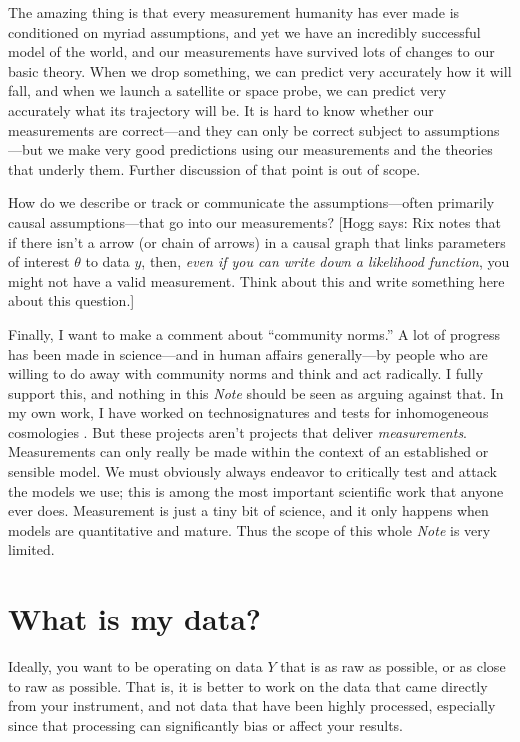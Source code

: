 \documentclass{article}
\newcommand{\documentname}{\textsl{Note}}
\newcommand{\hogg}[1]{{\color{blue}[Hogg says: {#1}]}}
\begin{document}
The amazing thing is that every measurement humanity has ever made is conditioned on myriad assumptions, and yet we have an incredibly successful model of the world, and our measurements have survived lots of changes to our basic theory.
When we drop something, we can predict very accurately how it will fall, and when we launch a satellite or space probe, we can predict very accurately what its trajectory will be.
It is hard to know whether our measurements are correct---and they can only be correct subject to assumptions---but we make very good predictions using our measurements and the theories that underly them.
Further discussion of that point is out of scope.

How do we describe or track or communicate the assumptions---often primarily causal assumptions---that go into our measurements?
\hogg{Rix notes that if there isn't a arrow (or chain of arrows) in a causal graph that links parameters of interest $\theta$ to data $y$, then, \emph{even if you can write down a likelihood function}, you might not have a valid measurement.
Think about this and write something here about this question.}

Finally, I want to make a comment about ``community norms.''
A lot of progress has been made in science---and in human affairs generally---by people who are willing to do away with community norms and think and act radically.
I fully support this, and nothing in this \documentname{} should be seen as arguing against that.
In my own work, I have worked on technosignatures \cite{techno} and tests for inhomogeneous cosmologies \cite{fractal}.
But these projects aren't projects that deliver \emph{measurements}.
Measurements can only really be made within the context of an established or sensible model.
We must obviously always endeavor to critically test and attack the models we use; this is among the most important scientific work that anyone ever does.
Measurement is just a tiny bit of science, and it only happens when models are quantitative and mature.
Thus the scope of this whole \documentname{} is very limited.

\section{What is my data?}\label{sec:data}
Ideally, you want to be operating on data $Y$ that is as raw as possible, or as close to raw as possible.
That is, it is better to work on the data that came directly from your instrument, and not data that have been highly processed, especially since that processing can significantly bias or affect your results.
\end{document}
